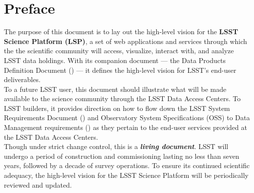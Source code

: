 \maketitle

\section{Preface\label{sec:preface}}

The purpose of this document is to lay out the high-level vision for the \textbf{LSST Science Platform (LSP)}, a set of web applications and services through which the the scientific community will access, visualize, interact with, and analyze LSST data holdings.
With its companion document --- the Data Products Definition Document (\DPDD) --- it defines the high-level vision for LSST's end-user deliverables.
\\

To a future LSST user, this document should illustrate what will be made available to the science community through the LSST Data Access Centers.
To LSST builders, it provides direction on how to flow down the LSST System Requirements Document (\LSR) and Observatory System Specifications (OSS) to Data Management requirements (\DMSR) as they pertain to the end-user services provided at the LSST Data Access Centers.
\\

Though under strict change control, this is a \textbf\emph{living document}.
LSST will undergo a period of construction and commissioning lasting no less than seven years, followed by a decade of survey operations.
To ensure its continued scientific adequacy, the high-level vision for the LSST Science Platform will be periodically reviewed and updated.
